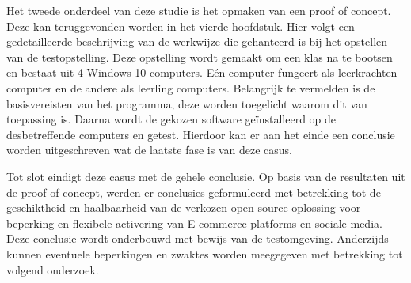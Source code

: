 Het tweede onderdeel van deze studie is het opmaken van een proof of concept. Deze kan teruggevonden worden in het vierde hoofdstuk. Hier volgt een gedetailleerde beschrijving van de werkwijze die gehanteerd is bij het opstellen van de testopstelling. Deze opstelling wordt gemaakt om een klas na te bootsen en bestaat uit 4 Windows 10 computers. Eén computer fungeert als leerkrachten computer en de andere als leerling computers. Belangrijk te vermelden is de basisvereisten van het programma, deze worden toegelicht waarom dit van toepassing is. Daarna wordt de gekozen software geïnstalleerd op de desbetreffende computers en getest. Hierdoor kan er aan het einde een conclusie worden uitgeschreven wat de laatste fase is van deze casus.\newline

Tot slot eindigt deze casus met de gehele conclusie. Op basis van de resultaten uit de proof of concept, werden er conclusies geformuleerd met betrekking tot de geschiktheid en haalbaarheid van de verkozen open-source oplossing voor beperking en flexibele activering van E-commerce platforms en sociale media. Deze conclusie wordt onderbouwd met bewijs van de testomgeving. Anderzijds kunnen eventuele beperkingen en zwaktes worden meegegeven met betrekking tot volgend onderzoek.

 